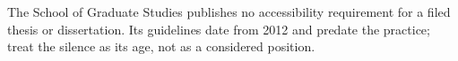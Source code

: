 \thesissetchapteropening{2in}


	{The School of Graduate Studies publishes no accessibility requirement for a
	 filed thesis or dissertation. Its guidelines date from 2012 and predate the
	 practice; treat the silence as its age, not as a considered position.}

